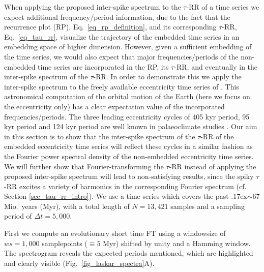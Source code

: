 \documentclass[entropy,article,submit,pdftex,moreauthors]{Definitions/mdpi}
\newcommand{\mytilde}{\raise.17ex\hbox{$\scriptstyle\mathtt{\sim}$}}
\begin{document}
When applying the proposed inter-spike spectrum to the $\tau$-RR of a time series we expect additional frequency/period information, due to the fact that the recurrence plot (RP), 
Eq.~\eqref{eq_rp_definition}, and its corresponding $\tau$-RR, Eq.~\eqref{eq_tau_rr}, visualize the trajectory of the embedded time series in an embedding space of higher dimension. 
However, given a sufficient embedding of the time series, we would also expect that major frequencies/periods of the non-embedded time series are incorporated in the RP, its $\tau$-RR, 
and eventually in the inter-spike spectrum of the $\tau$-RR. In order to demonstrate this we apply the inter-spike spectrum to the freely available eccentricity time series of \citet{Laskar2011}. 
This astronomical computation of the orbital motion of the Earth (here we focus on the eccentricity only) has a clear expectation value of the incorporated frequencies/periods. The three leading 
eccentricity cycles of 405 kyr period, 95 kyr period and 124 kyr period are well known in palaeoclimate studies \cite{Laskar2004,Westerhold2020}. Our aim in this section is to show that the inter-spike spectrum 
of the $\tau$-RR of the embedded eccentricity time series will reflect these cycles in a similar fashion as the Fourier power spectral density of the non-embedded eccentricity time series. We will further 
show that Fourier-transforming the $\tau$-RR instead of applying the proposed inter-spike spectrum will lead to non-satisfying results, since the spiky $\tau$-RR excites a variety of harmonics in 
the corresponding Fourier spectrum (cf. Section \ref{sec_tau_rr_intro}). We use a time series which covers the past \mytilde $67$ Mio.~years (Myr), with a total length of $N=13,421$ samples and a 
sampling period of $\Delta t= 5,000$.

First we compute an evolutionary short time FT using a windowsize of $ws=1,000$ samplepoints ($\equiv 5$ Myr) shifted by unity and a 
Hamming window. The spectrogram reveals the expected periods mentioned, which are highlighted and clearly visible (Fig.~\ref{fig_laskar_spectra}A). 
\end{document}
